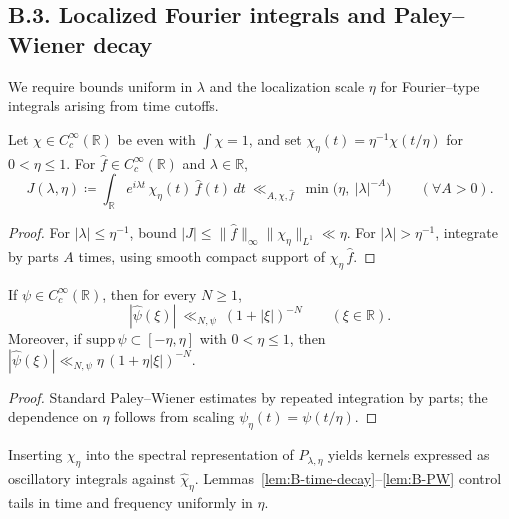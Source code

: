 \subsection*{B.3. Localized Fourier integrals and Paley–Wiener decay}
\noindent We require bounds uniform in \(\lambda\) and the localization scale \(\eta\) for Fourier–type integrals arising from time cutoffs.

\begin{lemma}\label{lem:B-time-decay}
Let \(\chi\in C_c^\infty(\mathbb{R})\) be even with \(\int\chi=1\), and set \(\chi_\eta(t)=\eta^{-1}\chi(t/\eta)\) for \(0<\eta\le 1\). For \(\widehat{f}\in C_c^\infty(\mathbb{R})\) and \(\lambda\in\mathbb{R}\),
\[
J(\lambda,\eta)\coloneqq \int_{\mathbb{R}} e^{i\lambda t}\,\chi_\eta(t)\,\widehat{f}(t)\,dt
\ \ll_{A,\chi,\widehat{f}}\ \min\!\big(\eta,\ |\lambda|^{-A}\big)\qquad(\forall A>0).
\]
\end{lemma}

\begin{proof}
For \(|\lambda|\le \eta^{-1}\), bound \(|J|\le \|\widehat{f}\|_\infty\|\chi_\eta\|_{L^1}\ll \eta\). For \(|\lambda|>\eta^{-1}\), integrate by parts \(A\) times, using smooth compact support of \(\chi_\eta\,\widehat{f}\).
\end{proof}

\begin{lemma}\label{lem:B-PW}
If \(\psi\in C_c^\infty(\mathbb{R})\), then for every \(N\ge 1\),
\[
|\widehat{\psi}(\xi)|\ \ll_{N,\psi}\ (1+|\xi|)^{-N}\qquad(\xi\in\mathbb{R}).
\]
Moreover, if \(\mathrm{supp}\,\psi\subset[-\eta,\eta]\) with \(0<\eta\le 1\), then
\(|\widehat{\psi}(\xi)|\ll_{N,\psi}\eta\,(1+\eta|\xi|)^{-N}\).
\end{lemma}

\begin{proof}
Standard Paley–Wiener estimates by repeated integration by parts; the dependence on \(\eta\) follows from scaling \(\psi_\eta(t)=\psi(t/\eta)\).
\end{proof}

\begin{remark}\label{rem:B-PW-application}
Inserting \(\chi_\eta\) into the spectral representation of \(P_{\lambda,\eta}\) yields kernels expressed as oscillatory integrals against \(\widehat{\chi}_\eta\). Lemmas~\ref{lem:B-time-decay}–\ref{lem:B-PW} control tails in time and frequency uniformly in \(\eta\).
\end{remark}

